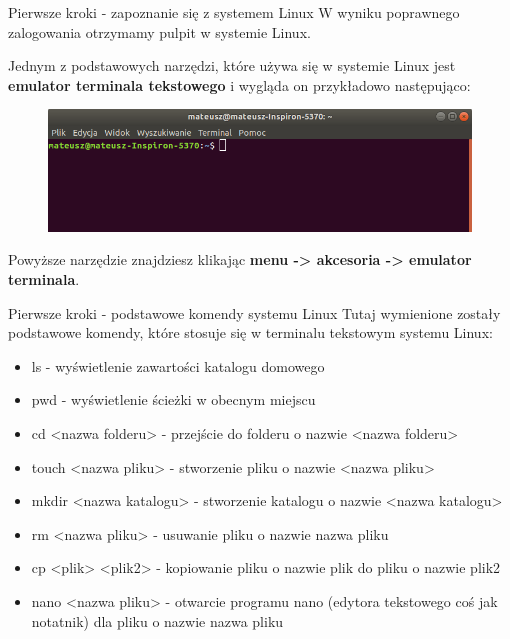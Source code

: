 \documentclass[10pt,ignorenonframetext,]{beamer}
\begin{document}
\begin{frame}{Pierwsze kroki - zapoznanie się z systemem Linux}
  W wyniku poprawnego zalogowania otrzymamy pulpit w systemie Linux.
  
  Jednym z podstawowych narzędzi, które używa się w systemie Linux jest \textbf{emulator terminala tekstowego} i wygląda on przykładowo następująco: 
  
  \begin{figure}[!h]
  	\centering
  	\includegraphics[scale=0.45]{pictures/terminal.png}
  \end{figure}
  Powyższe narzędzie znajdziesz klikając \textbf{menu -> akcesoria -> emulator terminala}.
\end{frame}

\begin{frame}{Pierwsze kroki - podstawowe komendy systemu Linux}
  Tutaj wymienione zostały podstawowe komendy, które stosuje się w terminalu tekstowym systemu Linux:	
  \begin{itemize}
  	\item ls - wyświetlenie zawartości katalogu domowego
  	\item pwd - wyświetlenie ścieżki w obecnym miejscu
  	\item cd <nazwa folderu> - przejście do folderu o nazwie <nazwa folderu>
  	\item touch <nazwa pliku> - stworzenie pliku o nazwie <nazwa pliku>
  	\item mkdir <nazwa katalogu> - stworzenie katalogu o nazwie <nazwa katalogu>
  	\item rm <nazwa pliku> - usuwanie pliku o nazwie nazwa pliku
  	\item cp <plik> <plik2> - kopiowanie pliku o nazwie plik do pliku o nazwie plik2
  	\item nano <nazwa pliku> - otwarcie programu nano (edytora tekstowego coś jak notatnik) dla pliku o nazwie nazwa pliku
  \end{itemize}
\end{frame}
\end{document}

